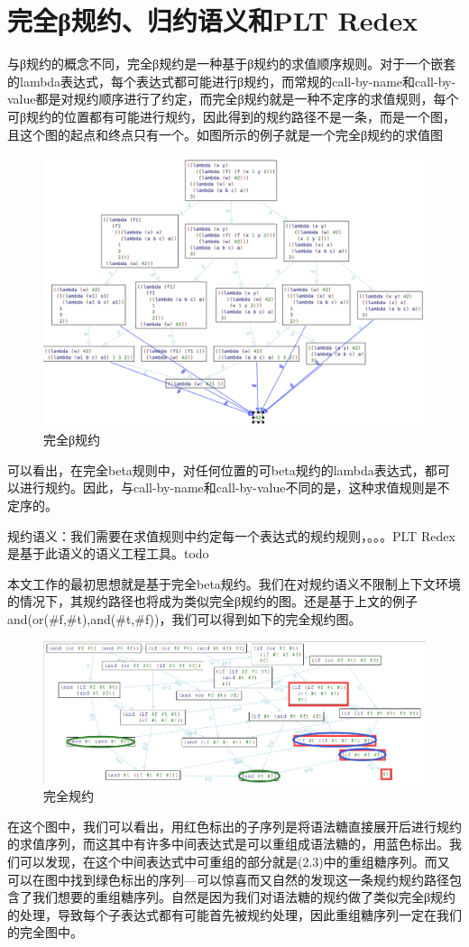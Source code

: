 \section{完全β规约、归约语义和PLT Redex}
与β规约的概念不同，完全β规约是一种基于β规约的求值顺序规则。对于一个嵌套的lambda表达式，每个表达式都可能进行β规约，而常规的call-by-name和call-by-value都是对规约顺序进行了约定，而完全β规约就是一种不定序的求值规则，每个可β规约的位置都有可能进行规约，因此得到的规约路径不是一条，而是一个图，且这个图的起点和终点只有一个。如图所示的例子就是一个完全β规约的求值图

\begin{figure}[h]
	\centering
	\includegraphics[width=12cm]{images/chapter2/fullbeta.png}
	\caption{完全β规约}
\end{figure}

可以看出，在完全beta规则中，对任何位置的可beta规约的lambda表达式，都可以进行规约。因此，与call-by-name和call-by-value不同的是，这种求值规则是不定序的。


规约语义：我们需要在求值规则中约定每一个表达式的规约规则，。。。PLT Redex是基于此语义的语义工程工具。todo

本文工作的最初思想就是基于完全beta规约。我们在对规约语义不限制上下文环境的情况下，其规约路径也将成为类似完全β规约的图。还是基于上文的例子and(or(\#f,\#t),and(\#t,\#f))，我们可以得到如下的完全规约图。

\begin{figure}[h]
	\centering
	\includegraphics[width=12cm]{images/chapter2/fullreduction.png}
	\caption{完全规约}
\end{figure}

在这个图中，我们可以看出，用红色标出的子序列是将语法糖直接展开后进行规约的求值序列，而这其中有许多中间表达式是可以重组成语法糖的，用蓝色标出。我们可以发现，在这个中间表达式中可重组的部分就是(2.3)中的重组糖序列。而又可以在图中找到绿色标出的序列---可以惊喜而又自然的发现这一条规约规约路径包含了我们想要的重组糖序列。自然是因为我们对语法糖的规约做了类似完全β规约的处理，导致每个子表达式都有可能首先被规约处理，因此重组糖序列一定在我们的完全图中。
